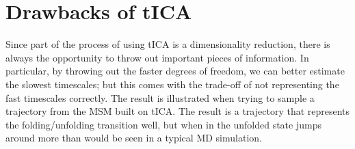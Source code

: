 \documentclass[12pt]{article}
\begin{document}
\section{Drawbacks of tICA}

Since part of the process of using tICA is a dimensionality reduction, there is always the opportunity to throw out important pieces of information. In particular, by throwing out the faster degrees of freedom, we can better estimate the slowest timescales; but this comes with the trade-off of not representing the fast timescales correctly. The result is illustrated when trying to sample a trajectory from the MSM built on tICA. The result is a trajectory that represents the folding/unfolding transition well, but when in the unfolded state jumps around more than would be seen in a typical MD simulation.


\end{document}
